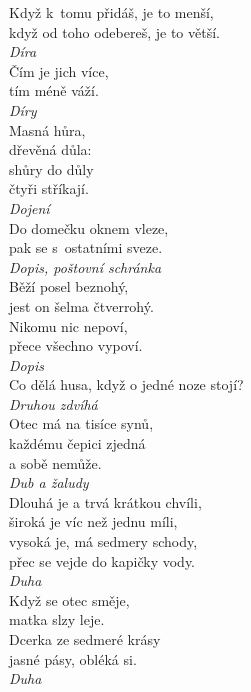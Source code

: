 \begin{multicols}{4}
\noindent
Když k~tomu přidáš, je to menší,\\
když od toho odebereš, je to větší.\\[1 mm]
{\sl Díra}\\

\noindent
Čím je jich více,\\
tím méně váží.\\[1 mm]
{\sl Díry}\\

\noindent
Masná hůra,\\
dřevěná důla:\\
shůry do důly\\
čtyři stříkají.\\[1 mm]
{\sl Dojení}\\

\noindent
Do domečku oknem vleze,\\
pak se s~ostatními sveze.\\[1 mm]
{\sl Dopis, poštovní schránka}\\

\noindent
Běží posel beznohý,\\
jest on šelma čtverrohý.\\
Nikomu nic nepoví,\\
přece všechno vypoví.\\[1 mm]
{\sl Dopis}\\

\noindent
Co dělá husa, když o jedné noze stojí?\\[1 mm]
{\sl Druhou zdvíhá}\\

\noindent
Otec má na tisíce synů,\\
každému čepici zjedná\\
a sobě nemůže.\\[1 mm]
{\sl Dub a žaludy}\\

\noindent
Dlouhá je a trvá krátkou chvíli,\\
široká je víc než jednu míli,\\
vysoká je, má sedmery schody,\\
přec se vejde do kapičky vody.\\[1 mm]
{\sl Duha}\\

\noindent
Když se otec směje,\\
matka slzy leje.\\
Dcerka ze sedmeré krásy\\
jasné pásy, obléká si.\\[1 mm]
{\sl Duha}\\


\end{multicols}
